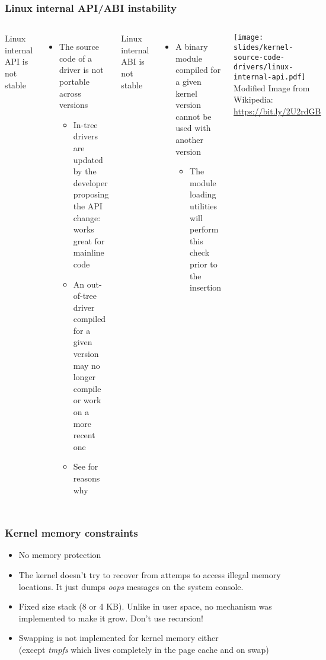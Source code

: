 \begin{frame}
  \frametitle{Linux internal API/ABI instability}
  \begin{columns}
    Linux internal API is not stable
    \begin{itemize}
    \item The source code of a driver is not portable across versions
      \begin{itemize}
      \item In-tree drivers are updated by the developer proposing the API
        change: works great for mainline code
      \item An out-of-tree driver compiled for a given version may no
        longer compile or work on a more recent one
      \item See  for reasons why
      \end{itemize}
    \end{itemize}
    Linux internal ABI is not stable
    \begin{itemize}
    \item A binary module compiled for a given kernel version cannot be
      used with another version
      \begin{itemize}
      \item The module loading utilities will perform this check prior
        to the insertion
      \end{itemize}
    \end{itemize}
    \texttt{[image: slides/kernel-source-code-drivers/linux-internal-api.pdf]}
    \tiny
    Modified Image from Wikipedia:\\
    \url{https://bit.ly/2U2rdGB}
  \end{columns}
\end{frame}

\begin{frame}
  \frametitle{Kernel memory constraints}
  \begin{itemize}
  \item No memory protection
  \item The kernel doesn't try to recover from attemps to access illegal
    memory locations. It just dumps {\em oops} messages on the system console.
  \item Fixed size stack (8 or 4 KB). Unlike in user space, no mechanism
    was implemented to make it grow. Don't use recursion!
  \item Swapping is not implemented for kernel memory either\\
    (except {\em tmpfs} which lives completely in the page cache and on swap)
  \end{itemize}
\end{frame}

